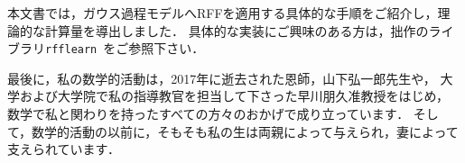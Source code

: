 %

本文書では，ガウス過程モデルへRFFを適用する具体的な手順をご紹介し，理論的な計算量を導出しました．
具体的な実装にご興味のある方は，拙作のライブラリ\texttt{rfflearn}~\cite{rfflearn}をご参照下さい．

最後に，私の数学的活動は，2017年に逝去された恩師，山下弘一郎先生や，
大学および大学院で私の指導教官を担当して下さった早川朋久准教授をはじめ，
数学で私と関わりを持ったすべての方々のおかげで成り立っています．
そして，数学的活動の以前に，そもそも私の生は両親によって与えられ，妻によって支えられています．

